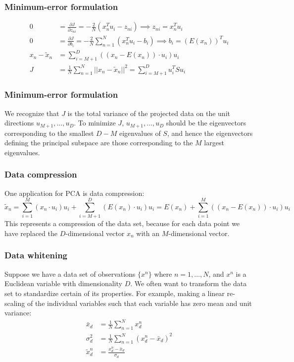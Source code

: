 \documentclass{beamer}
\begin{document}
\begin{frame}
    \frametitle{Minimum-error formulation}
    \begin{align*}
        0&=\frac{\partial{}J}{\partial{}z_{ni}}=-\frac{2}{N}(x_{n}^{T}u_{i}-z_{ni})\implies{}z_{ni}=x_{n}^{T}u_{i} \\
        0&=\frac{\partial{}J}{\partial{}b_{i}}=-\frac{2}{N}\sum_{n=1}^{N}(x_{n}^{T}u_{i}-b_{i})\implies{}b_{i}=(E(x_{n}))^{T}u_{i} \\
        x_{n}-\tilde{x}_{n}&=\sum_{i=M+1}^{D}((x_{n}-E(x_{n}))\cdot{}u_{i})u_{i} \\
        J&=\frac{1}{N}\sum_{n=1}^{N}||x_{n}-\tilde{x}_{n}||^{2}=\sum_{i=M+1}^{D}u_{i}^{T}Su_{i}
    \end{align*}
\end{frame}

\begin{frame}
    \frametitle{Minimum-error formulation}
    We recognize that $J$ is the total variance of the projected data on the unit directions $u_{M+1},\hdots,u_{D}$. To minimize $J$, $u_{M+1},\hdots,u_{D}$ should be the eigenvectors corresponding to the smallest $D-M$ eigenvalues of $S$, and hence the eigenvectors defining the principal subspace are those corresponding to the $M$ largest eigenvalues.
\end{frame}

\begin{frame}
    \frametitle{Data compression}
    One application for PCA is data compression:
    \begin{equation*}
        \tilde{x}_{n}=\sum_{i=1}^{M}(x_{n}\cdot{}u_{i})u_{i}+\sum_{i=M+1}^{D}(E(x_{n})\cdot{}u_{i})u_{i}=E(x_{n})+\sum_{i=1}^{M}((x_{n}-E(x_{n}))\cdot{}u_{i})u_{i}
    \end{equation*}
    This represents a compression of the data set, because for each data point we have replaced the $D$-dimensional vector $x_{n}$ with an $M$-dimensional vector.
\end{frame}

\begin{frame}
    \frametitle{Data whitening}
    Suppose we have a data set of observations $\{x^{n}\}$ where $n=1,\hdots,N$, and $x^{n}$ is a Euclidean variable with dimensionality $D$. We often want to transform the data set to standardize certain of its properties. For example, making a linear re-scaling of the individual variables such that each variable has zero mean and unit variance:
    \begin{align*}
        \bar{x}_{d}&=\frac{1}{N}\sum_{n=1}^{N}x^{n}_{d} \\
        \sigma^{2}_{d}&=\frac{1}{N}\sum_{n=1}^{N}(x^{n}_{d}-\bar{x}_{d})^{2} \\
        \tilde{x}^{n}_{d}&=\frac{x^{n}_{d}-\bar{x}_{d}}{\sigma_{d}}
    \end{align*}
\end{frame}
\end{document}
